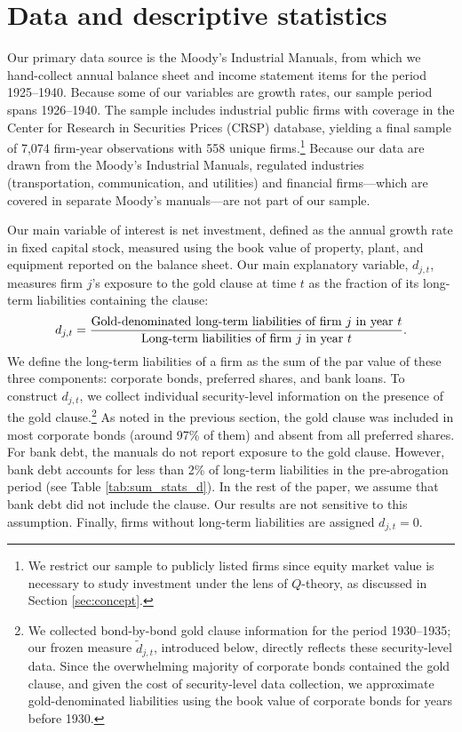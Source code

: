 \section{Data and descriptive statistics}
 \label{sec:data}

\noindent
Our primary data source is the Moody's Industrial Manuals, from which we hand-collect annual balance sheet and income statement items for the period 1925--1940. Because some of our variables are growth rates, our sample period spans 1926--1940. The sample includes industrial public firms with coverage in the Center for Research in Securities Prices (CRSP) database, yielding a final sample of 7,074 firm-year observations with 558 unique firms.\footnote{We restrict our sample to publicly listed firms since equity market value is necessary to study investment under the lens of $Q$-theory, as discussed in Section \ref{sec:concept}.} Because our data are drawn from the Moody's Industrial Manuals, regulated industries (transportation, communication, and utilities) and financial firms---which are covered in separate Moody's manuals---are not part of our sample.

Our main variable of interest is net investment, defined as the annual growth rate in fixed capital stock, measured using the book value of property, plant, and equipment reported on the balance sheet. Our main explanatory variable, $d_{j,t}$, measures firm $j$'s exposure to the gold clause at time $t$ as the fraction of its long-term liabilities containing the clause:
\begin{equation}
\label{eq:d}
d_{j,t} = \frac{\text{\normalsize{Gold-denominated long-term liabilities of firm $j$ in year $t$}}}{\text{\normalsize{Long-term liabilities of firm $j$ in year $t$}}}.
\end{equation}
We define the long-term liabilities of a firm as the sum of the par value of these three components: corporate bonds, preferred shares, and bank loans. To construct $d_{j,t}$, we collect individual security-level information on the presence of the gold clause.\footnote{We collected bond-by-bond gold clause information for the period 1930--1935; our frozen measure $\tilde{d}_{j,t}$, introduced below, directly reflects these security-level data. Since the overwhelming majority of corporate bonds contained the gold clause, and given the cost of security-level data collection, we approximate gold-denominated liabilities using the book value of corporate bonds for years before 1930.} As noted in the previous section, the gold clause was included in most corporate bonds (around 97\% of them) and absent from all preferred shares. For bank debt, the manuals do not report exposure to the gold clause. However, bank debt accounts for less than 2\% of long-term liabilities in the pre-abrogation period (see Table \ref{tab:sum_stats_d}). In the rest of the paper, we assume that bank debt did not include the clause. Our results are not sensitive to this assumption. Finally, firms without long-term liabilities are assigned $d_{j,t} = 0$.

